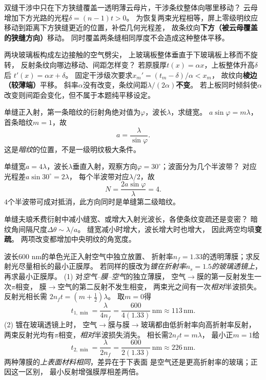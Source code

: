 \problemtext 双缝干涉中只在下方狭缝覆盖一透明薄云母片，干涉条纹整体向哪里移动？
\workings
云母增加下方光路的光程$\delta=(n-1)t>0$。
为恢复两束光程相等，屏上零级明纹应移动到距离下方狭缝更近的位置，补偿几何光程差，
故条纹向\textbf{下方（被云母覆盖的狭缝方向）}移动。
\crosscheck 同时覆盖两条缝相同厚度不会造成这种整体平移。

\problemtext 两块玻璃板构成左边接触的空气劈尖，
上玻璃板整体垂直于下玻璃板上移而不旋转，
反射条纹向哪边移动、间距怎样变？
\workings
若原膜厚$t(x)=\alpha x$，上板整体升高$\delta$后
$t'(x)=\alpha x+\delta$。
固定干涉级次要求$x_m'=(t_m-\delta)/\alpha<x_m$，
故纹向\textbf{棱边（较薄端）}平移。
斜率$\alpha$没有改变，条纹间距$\lambda/(2\alpha)$\textbf{不变}。
\crosscheck 若上板同时倾斜使$\alpha$改变则间距会变化，但不属于本题纯平移设定。

\problemtext 单缝正入射，第一条暗纹的衍射角绝对值为$\varphi$，波长$\lambda$，求缝宽。
\workings
$a\sin\varphi=m\lambda$，首条暗纹$m=1$，故
\[
\boxed{a=\frac{\lambda}{\sin\varphi}}.
\]
\crosscheck 这是\emph{暗纹}的位置，不是一级明纹极大条件。

\problemtext 单缝宽$a=4\lambda$，波长$\lambda$垂直入射，观察方向$\varphi=30^\circ$；波面分为几个半波带？
\workings
对应光程差$a\sin30^\circ=2\lambda$，
每个半波带对应$\lambda/2$，故
\[
\boxed{N=\frac{2a\sin\varphi}{\lambda}=4}.
\]
\crosscheck $4$个半波带可成对抵消，此方向同时是单缝第二级暗纹。

\problemtext 单缝夫琅禾费衍射中减小缝宽、或增大入射光波长，各使条纹变疏还是变密？
\workings
暗纹角间隔尺度$\Delta\theta\sim\lambda/a$。
缝宽减小时增大，波长增大时也增大，
因此两空均填\textbf{变疏}。
\crosscheck 两项改变都增加中央明纹的角宽度。

\problemtext 波长$600$ nm的单色光正入射空气中独立放置、
折射率$n_f=1.33$的透明薄膜；求反射光尽量相长的最小正膜厚。
若同样的膜改为\emph{镀在折射率$n_s=1.5$的玻璃透镜上}，
再求最小正膜厚。
\workings
(1) 对\emph{空气--膜--空气}的独立薄膜，
空气$\to$膜的第一反射发生一次$\pi$相变，
膜$\to$空气的第二反射不发生相变，
两束光之间有一次\emph{相对}半波损失。
反射光相长需
$2n_ft=(m+\tfrac12)\lambda$。
取$m=0$得
\[
\boxed{t_{1,\min}=\frac{\lambda}{4n_f}
=\frac{600}{4(1.33)}\,\mathrm{nm}\approx113\,\mathrm{nm}}.
\]
(2) 镀在玻璃透镜上时，
空气$\to$膜与膜$\to$玻璃都由低折射率向高折射率反射，
两束反射光均有$\pi$相变，\emph{相对}半波损失消失。
相长需$2n_ft=m\lambda$，
最小正$m=1$给
\[
\boxed{t_{2,\min}=\frac{\lambda}{2n_f}
=\frac{600}{2(1.33)}\,\mathrm{nm}\approx226\,\mathrm{nm}}.
\]
\crosscheck 两种薄膜的\emph{上表面材料相同}，差异在于下表面
是空气还是更高折射率的玻璃；正因这一区别，
最小反射增强膜厚相差两倍。

